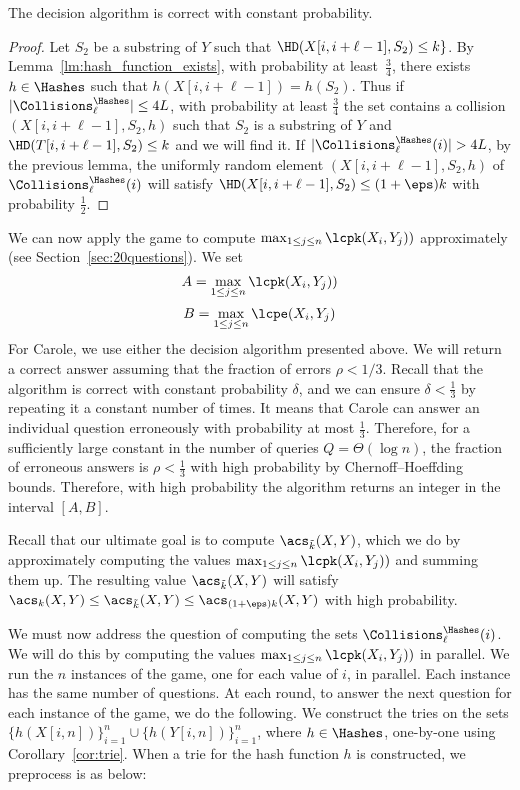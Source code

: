 \begin{corollary}
The decision algorithm is correct with constant probability.
\end{corollary}
\begin{proof}

Let $S_2$ be a substring of $Y$ such that $\HD(X[i,i+\ell-1], S_2) \leq k \}$.
By Lemma~\ref{lm:hash_function_exists}, with probability at least~$\frac34$, there exists $h \in \Hashes$ such that $h(X[i,i+\ell-1]) = h(S_2)$.
Thus if $|\Collisions^{\Hashes}_{\ell}| \le 4L$, with probability at least $\frac34$ the set contains a collision $(X[i,i+\ell-1], S_2, h)$ such that $S_2$ is a substring of $Y$ and $\HD(T[i,i+\ell-1], S_2) \leq k $ and we will find it. If $|\Collisions^{\Hashes}_{\ell}(i)| > 4L$, by the previous lemma, the uniformly random element $(X[i,i+\ell-1],S_2, h)$ of $\Collisions^{\Hashes}_{\ell}(i)$ will satisfy $\HD(X[i,i+\ell-1],S_2) \le (1+\eps)k$ with probability $\frac12$.
\end{proof}

We can now apply the \twentyquestions game to compute $\max_{1 \le j \le n} \lcpk(X_i, Y_j))$ approximately (see Section~\ref{sec:20questions}). We set 
$$A = \max_{1 \le j \le n} \lcpk(X_i, Y_j))$$
$$B = \max_{1 \le j \le n} \lcpe(X_i, Y_j)$$
For Carole, we use either the decision algorithm presented above. We will return a correct answer assuming that the fraction of errors $\rho <1/3$. Recall that the algorithm is correct with constant probability $\delta$, and we can ensure $\delta < \frac13$ by repeating it a constant number of times. It means that Carole can answer an individual question erroneously with probability at most $\frac13$. Therefore, for a sufficiently large constant in the number of queries $Q = \Theta(\log n)$, the fraction of erroneous answers is $\rho < \frac13$ with high probability by Chernoff--Hoeffding bounds. Therefore, with high probability the algorithm returns an integer in the interval $[A, B]$. 

Recall that our ultimate goal is to compute $\acs_{\tilde{k}} (X, Y)$, which we do by approximately computing the values $\max_{1 \le j \le n} \lcpk(X_i, Y_j))$ and summing them up. The resulting value $\acs_{\tilde{k}} (X, Y)$ will satisfy $\acs_k (X, Y) \le \acs_{\tilde{k}} (X, Y) \le \acs_{(1+\eps)k} (X, Y)$ with high probability. 

We must now address the question of computing the sets $\Collisions^{\Hashes}_{\ell}(i)$.  We will do this by computing the values $\max_{1 \le j \le n} \lcpk(X_i, Y_j))$ in parallel. We run the $n$ instances of the \twentyquestions game, one for each value of $i$, in parallel. Each instance has the same number of questions. At each round, to answer the next question for each instance of the game, we do the following. We construct the tries on the sets $\{h(X[i,n])\}_{i=1}^n \cup \{h(Y[i,n])\}_{i=1}^n$, where $h \in \Hashes$, one-by-one using Corollary~\ref{cor:trie}. When a trie for the hash function $h$ is constructed, we preprocess is as below:

